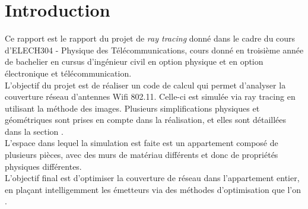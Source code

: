 \chapter*{Introduction}
\label{introduction}
Ce rapport est le rapport du projet de \textit{ray tracing} donné dans le cadre du cours d'ELECH304 - Physique des Télécommunications, cours donné en troisième année de bachelier en cursus d'ingénieur civil en option physique et en option électronique et télécommunication.\\
L'objectif du projet est de réaliser un code de calcul qui permet d'analyser la couverture réseau d'antennes Wifi 802.11.
Celle-ci est simulée via ray tracing en utilisant la méthode des images. Plusieurs simplifications physiques et géométriques sont prises en compte dans la réalisation, et elles sont détaillées dans la section .\\
L'espace dans lequel la simulation est faite est un appartement composé de plusieurs pièces, avec des murs de matériau différents et donc de propriétés physiques différentes. \\
L'objectif final est d'optimiser la couverture de réseau dans l'appartement entier, en plaçant intelligemment les émetteurs via des méthodes d'optimisation que l'on .
